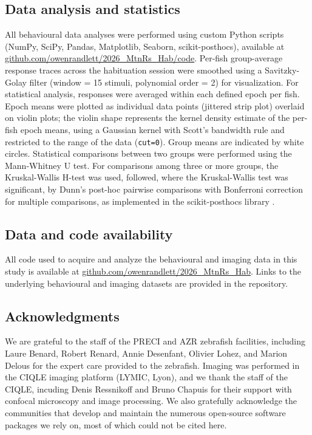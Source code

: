 \documentclass[9.5pt]{RandlettLab_elife}            %
\begin{document}
\subsection{Data analysis and statistics}
All behavioural data analyses were performed using custom Python scripts (NumPy, SciPy, Pandas, Matplotlib, Seaborn, scikit-posthocs), available at \href{https://github.com/owenrandlett/2026_MtnRs_Hab/tree/main/code}{github.com/owenrandlett/2026\_MtnRs\_Hab/code}.
Per-fish group-average response traces across the habituation session were smoothed using a Savitzky-Golay filter (window = 15 stimuli, polynomial order = 2) for visualization.
For statistical analysis, responses were averaged within each defined epoch per fish.
Epoch means were plotted as individual data points (jittered strip plot) overlaid on violin plots; the violin shape represents the kernel density estimate of the per-fish epoch means, using a Gaussian kernel with Scott's bandwidth rule and restricted to the range of the data (\texttt{cut=0}).
Group means are indicated by white circles.
Statistical comparisons between two groups were performed using the Mann-Whitney U test.
For comparisons among three or more groups, the Kruskal-Wallis H-test was used, followed, where the Kruskal-Wallis test was significant, by Dunn's post-hoc pairwise comparisons with Bonferroni correction for multiple comparisons, as implemented in the scikit-posthocs library \citep{Terpilowski2019}.


\subsection{Data and code availability}

All code used to acquire and analyze the behavioural and imaging data in this study is available at \href{https://github.com/owenrandlett/2026_MtnRs_Hab}{github.com/owenrandlett/2026\_MtnRs\_Hab}. Links to the underlying behavioural and imaging datasets are provided in the repository.

\subsection{Acknowledgments}

We are grateful to the staff of the PRECI and AZR zebrafish facilities, including Laure Benard, Robert Renard, Annie Desenfant, Olivier Lohez, and Marion Delous for the expert care provided to the zebrafish. 
Imaging was performed in the CIQLE imaging platform (LYMIC, Lyon), and we thank the staff of the CIQLE, incuding Denis Ressnikoff and Bruno Chapuis for their support with confocal microscopy and image processing.
We also gratefully acknowledge the communities that develop and maintain the numerous open-source software packages we rely on, most of which could not be cited here.
\end{document}
